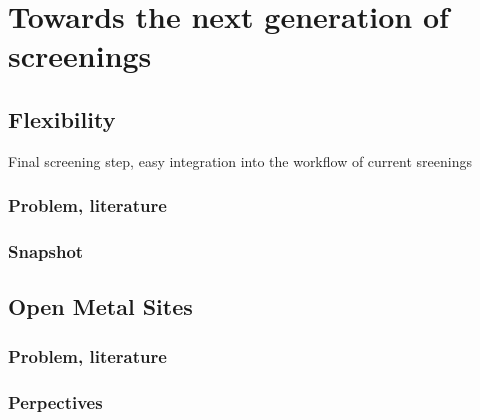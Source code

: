 \documentclass[main]{subfiles}
\begin{document}
\chapter{Towards the next generation of screenings}
\vspace*{-1\baselineskip}
\section{Flexibility}
Final screening step, easy integration into the workflow of current sreenings
\subsection{Problem, literature}

\subsection{Snapshot}

\section{Open Metal Sites}

\subsection{Problem, literature}

\subsection{Perpectives}

\OnlyInSubfile{\printglobalbibliography}
\end{document}
